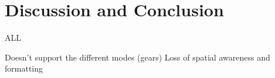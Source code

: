 \section{Discussion and Conclusion}
ALL

Doesn't support the different modes (gears)
Loss of spatial awareness and formatting
